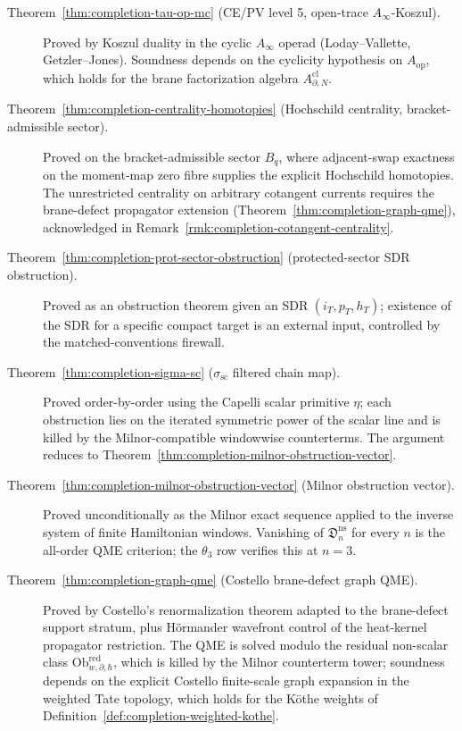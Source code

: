 \begin{description}
\item[Theorem~\ref{thm:completion-tau-op-mc} (CE/PV level 5,
  open-trace \(A_\infty\)-Koszul).]  Proved by Koszul duality in
  the cyclic \(A_\infty\) operad (Loday--Vallette,
  Getzler--Jones).  Soundness depends on the cyclicity hypothesis
  on \(A_{\mathrm{op}}\), which holds for the brane factorization
  algebra \(A^{\mathrm{cl}}_{\partial,N}\).

\item[Theorem~\ref{thm:completion-centrality-homotopies} (Hochschild
  centrality, bracket-admissible sector).]  Proved on the
  bracket-admissible sector \(B_q\), where adjacent-swap
  exactness on the moment-map zero fibre supplies the explicit
  Hochschild homotopies.  The unrestricted centrality on
  arbitrary cotangent currents requires the brane-defect
  propagator extension (Theorem~\ref{thm:completion-graph-qme}),
  acknowledged in Remark~\ref{rmk:completion-cotangent-centrality}.

\item[Theorem~\ref{thm:completion-prot-sector-obstruction}
  (protected-sector SDR obstruction).]  Proved as an obstruction
  theorem given an SDR \((i_T,p_T,h_T)\); existence of the SDR
  for a specific compact target is an external input, controlled
  by the matched-conventions firewall.

\item[Theorem~\ref{thm:completion-sigma-sc} (\(\sigma_{\mathrm{sc}}\)
  filtered chain map).]  Proved order-by-order using the Capelli
  scalar primitive \(\eta\); each obstruction lies on the
  iterated symmetric power of the scalar line and is killed by
  the Milnor-compatible windowwise counterterms.  The argument
  reduces to
  Theorem~\ref{thm:completion-milnor-obstruction-vector}.

\item[Theorem~\ref{thm:completion-milnor-obstruction-vector}
  (Milnor obstruction vector).]  Proved unconditionally as the
  Milnor exact sequence applied to the inverse system of finite
  Hamiltonian windows.  Vanishing of \(\mathfrak D^{\mathrm{ns}}_n\)
  for every \(n\) is the all-order QME criterion; the
  \(\theta_3\) row verifies this at \(n=3\).

\item[Theorem~\ref{thm:completion-graph-qme} (Costello brane-defect
  graph QME).]  Proved by Costello's renormalization theorem
  adapted to the brane-defect support stratum, plus H\"ormander
  wavefront control of the heat-kernel propagator restriction.
  The QME is solved modulo the residual non-scalar class
  \(\mathrm{Ob}^{\mathrm{red}}_{w,\partial,\hbar}\), which is
  killed by the Milnor counterterm tower; soundness depends on
  the explicit Costello finite-scale graph expansion in the
  weighted Tate topology, which holds for the K\"othe weights of
  Definition~\ref{def:completion-weighted-kothe}.


\end{description}
